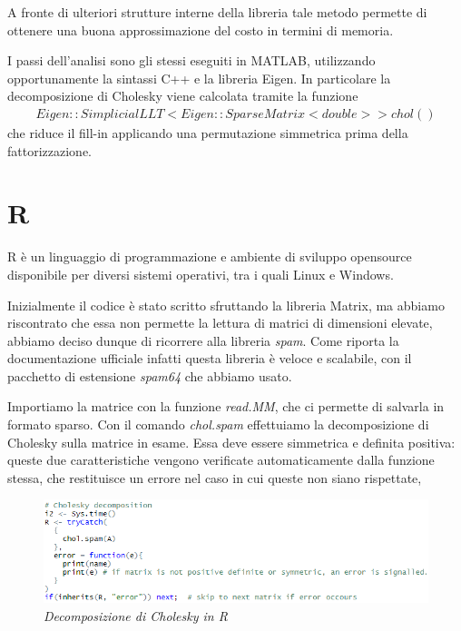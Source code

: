 \documentclass[a4paper,12pt]{article}
\begin{document}
\noindent A fronte di ulteriori strutture interne della libreria tale metodo permette di ottenere una buona approssimazione del costo in termini di memoria. 
\bigskip

\noindent I passi dell’analisi sono gli stessi eseguiti in MATLAB, utilizzando opportunamente la sintassi C++ e la libreria Eigen. In particolare la decomposizione di Cholesky viene calcolata tramite la funzione 
\begin{align*}
Eigen::SimplicialLLT<Eigen::SparseMatrix<double>> chol()
\end{align*}
che riduce il fill-in applicando una permutazione simmetrica prima della fattorizzazione. %

\newpage

\fancyhf{}
\fancyfoot[C]{\thepage}

\section{R}
R è un linguaggio di programmazione e ambiente di sviluppo opensource disponibile per diversi sistemi operativi, tra i quali Linux e Windows.
\bigskip

\noindent Inizialmente il codice è stato scritto sfruttando la libreria Matrix, ma abbiamo riscontrato che essa non permette la lettura di matrici di dimensioni elevate, abbiamo deciso dunque di ricorrere alla libreria \textit{spam}. Come riporta la documentazione ufficiale infatti questa libreria è veloce e scalabile, con il pacchetto di estensione \textit{spam64} che abbiamo usato.
\bigskip

\noindent Importiamo la matrice con la funzione \textit{read.MM}, che ci permette di salvarla in formato sparso.
Con il comando \textit{chol.spam} effettuiamo la decomposizione di Cholesky sulla matrice in esame. Essa deve essere simmetrica e definita positiva: queste due caratteristiche vengono verificate automaticamente dalla funzione stessa, che restituisce un errore nel caso in cui queste non siano rispettate, 
\bigskip

\begin{figure}[H]
\centering
\includegraphics[width=0.9\linewidth]{img/R1.png}
\caption{\textit{Decomposizione di Cholesky in R}}
\end{figure}
\end{document}
